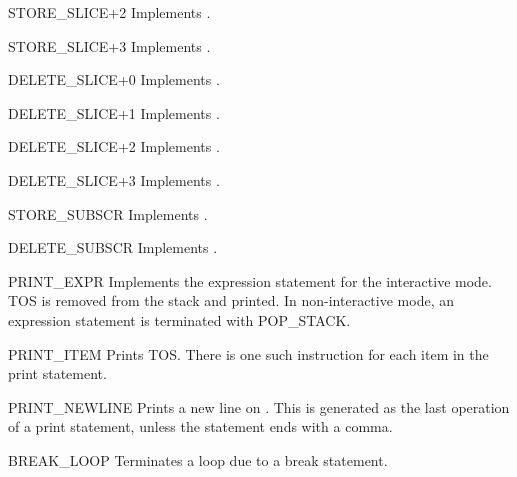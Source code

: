 \begin{funcdesc}{STORE_SLICE+2}{}
Implements .
\end{funcdesc}

\begin{funcdesc}{STORE_SLICE+3}{}
Implements .
\end{funcdesc}

\begin{funcdesc}{DELETE_SLICE+0}{}
Implements .
\end{funcdesc}

\begin{funcdesc}{DELETE_SLICE+1}{}
Implements .
\end{funcdesc}

\begin{funcdesc}{DELETE_SLICE+2}{}
Implements .
\end{funcdesc}

\begin{funcdesc}{DELETE_SLICE+3}{}
Implements .
\end{funcdesc}

\begin{funcdesc}{STORE_SUBSCR}{}
Implements .
\end{funcdesc}

\begin{funcdesc}{DELETE_SUBSCR}{}
Implements .
\end{funcdesc}

\begin{funcdesc}{PRINT_EXPR}{}
Implements the expression statement for the interactive mode.  TOS is
removed from the stack and printed.  In non-interactive mode, an
expression statement is terminated with POP_STACK.
\end{funcdesc}

\begin{funcdesc}{PRINT_ITEM}{}
Prints TOS.  There is one such instruction for
each item in the print statement.
\end{funcdesc}

\begin{funcdesc}{PRINT_NEWLINE}{}
Prints a new line on .  This is generated as the
last operation of a print statement, unless the statement ends
with a comma.
\end{funcdesc}

\begin{funcdesc}{BREAK_LOOP}{}
Terminates a loop due to a break statement.
\end{funcdesc}

